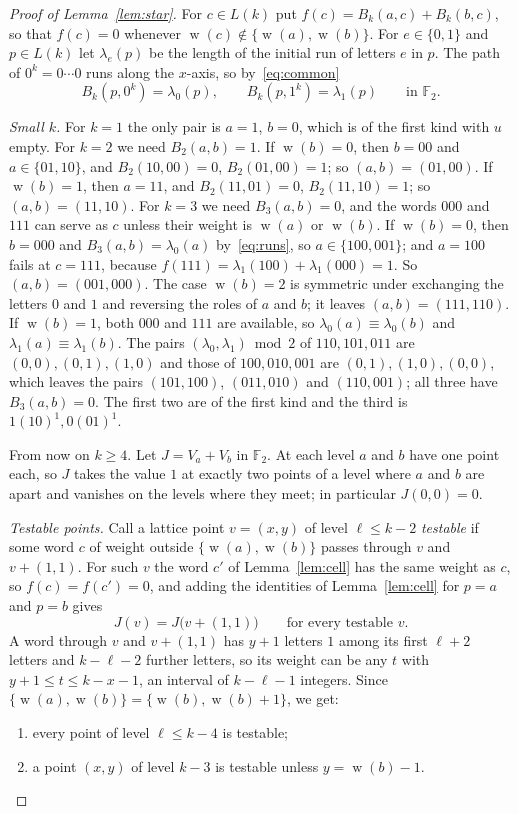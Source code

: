 \documentclass[screen]{aomart}
\theoremstyle{definition}
\theoremstyle{remark}
\numberwithin{equation}{section}
\newcommand{\F}{\mathbb{F}}
\DeclareMathOperator{\wt}{w}
\begin{document}
\begin{proof}[Proof of Lemma~\ref{lem:star}]
For $c\in L(k)$ put $f(c)=B_k(a,c)+B_k(b,c)$, so that $f(c)=0$ whenever $\wt(c)\notin\{\wt(a),\wt(b)\}$. For $e\in\{0,1\}$ and $p\in L(k)$ let $\lambda_e(p)$ be the length of the initial run of letters $e$ in $p$. The path of $0^k=0\cdots0$ runs along the $x$-axis, so by~\eqref{eq:common}
\begin{equation}\label{eq:runs}
B_k(p,0^k)=\lambda_0(p),\qquad B_k(p,1^k)=\lambda_1(p)\qquad\text{in }\F_2 .
\end{equation}

\emph{Small $k$.} For $k=1$ the only pair is $a=1$, $b=0$, which is of the first kind with $u$ empty. For $k=2$ we need $B_2(a,b)=1$. If $\wt(b)=0$, then $b=00$ and $a\in\{01,10\}$, and $B_2(10,00)=0$, $B_2(01,00)=1$; so $(a,b)=(01,00)$. If $\wt(b)=1$, then $a=11$, and $B_2(11,01)=0$, $B_2(11,10)=1$; so $(a,b)=(11,10)$. For $k=3$ we need $B_3(a,b)=0$, and the words $000$ and $111$ can serve as $c$ unless their weight is $\wt(a)$ or $\wt(b)$. If $\wt(b)=0$, then $b=000$ and $B_3(a,b)=\lambda_0(a)$ by~\eqref{eq:runs}, so $a\in\{100,001\}$; and $a=100$ fails at $c=111$, because $f(111)=\lambda_1(100)+\lambda_1(000)=1$. So $(a,b)=(001,000)$. The case $\wt(b)=2$ is symmetric under exchanging the letters $0$ and $1$ and reversing the roles of $a$ and $b$; it leaves $(a,b)=(111,110)$. If $\wt(b)=1$, both $000$ and $111$ are available, so $\lambda_0(a)\equiv\lambda_0(b)$ and $\lambda_1(a)\equiv\lambda_1(b)$. The pairs $(\lambda_0,\lambda_1)\bmod 2$ of $110,101,011$ are $(0,0),(0,1),(1,0)$ and those of $100,010,001$ are $(0,1),(1,0),(0,0)$, which leaves the pairs $(101,100)$, $(011,010)$ and $(110,001)$; all three have $B_3(a,b)=0$. The first two are of the first kind and the third is $1(10)^1,0(01)^1$.

From now on $k\ge4$. Let $J=V_a+V_b$ in $\F_2$. At each level $a$ and $b$ have one point each, so $J$ takes the value $1$ at exactly two points of a level where $a$ and $b$ are apart and vanishes on the levels where they meet; in particular $J(0,0)=0$.

\emph{Testable points.} Call a lattice point $v=(x,y)$ of level $\ell\le k-2$ \emph{testable} if some word $c$ of weight outside $\{\wt(a),\wt(b)\}$ passes through $v$ and $v+(1,1)$. For such $v$ the word $c'$ of Lemma~\ref{lem:cell} has the same weight as $c$, so $f(c)=f(c')=0$, and adding the identities of Lemma~\ref{lem:cell} for $p=a$ and $p=b$ gives
\begin{equation}\label{eq:diag}
J(v)=J\bigl(v+(1,1)\bigr)\qquad\text{for every testable }v .
\end{equation}
A word through $v$ and $v+(1,1)$ has $y+1$ letters $1$ among its first $\ell+2$ letters and $k-\ell-2$ further letters, so its weight can be any $t$ with $y+1\le t\le k-x-1$, an interval of $k-\ell-1$ integers. Since $\{\wt(a),\wt(b)\}=\{\wt(b),\wt(b)+1\}$, we get:
\begin{enumerate}[label=\textup{(T\arabic*)}]
\item every point of level $\ell\le k-4$ is testable;
\item a point $(x,y)$ of level $k-3$ is testable unless $y=\wt(b)-1$.
\end{enumerate}


\end{proof}
\end{document}
